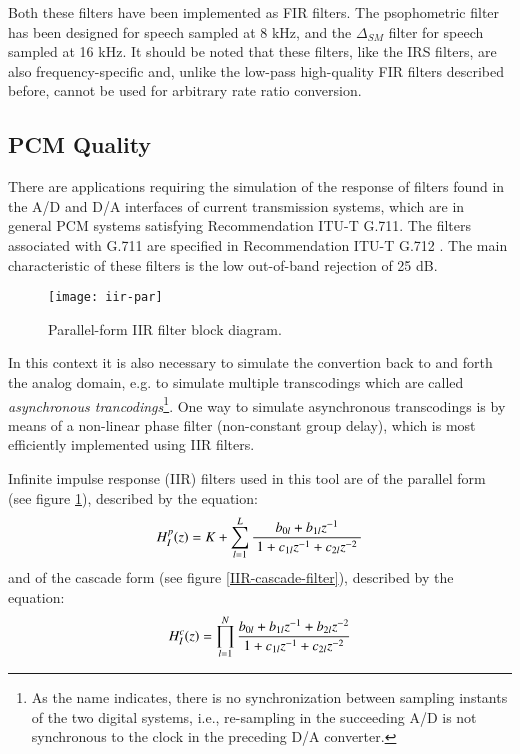 Both these filters have been implemented as FIR filters. The
psophometric filter has been designed for speech sampled at 8 kHz, and
the $\Delta_{SM}$ filter for speech sampled at 16 kHz. It should be
noted that these filters, like the IRS filters, are also
frequency-specific and, unlike the low-pass high-quality FIR filters
described before, cannot be used for arbitrary rate ratio conversion.

\subsection{PCM Quality}

There are applications requiring the simulation of the response of
filters found in the A/D and D/A interfaces of current transmission
systems, which are in general PCM systems satisfying Recommendation ITU-T G.711.
The filters associated with G.711 are specified in Recommendation ITU-T G.712 \cite{G.712}.
The main characteristic of these filters is the low out-of-band rejection of 25 dB.

\begin{figure}[h]
  \begin{center}
    \texttt{[image: iir-par]}
  \end{center}
  \caption{\SF Parallel-form IIR filter block diagram.\label{IIR-filter}}
\end{figure}

In this context it is also necessary to simulate the convertion back
to and forth the analog domain, e.g. to simulate multiple transcodings
which are called {\em asynchronous trancodings}\footnote{\SF As the
name indicates, there is no synchronization between sampling instants
of the two digital systems, i.e., re-sampling in the succeeding A/D is
not synchronous to the clock in the preceding D/A converter.}. One
way to simulate asynchronous transcodings is by means of a non-linear
phase filter (non-constant group delay), which is most efficiently
implemented using IIR filters.

Infinite impulse response (IIR) filters used in this tool are of the
parallel form (see figure \ref{IIR-filter}), described by the
equation:
\[
    H_I^p(z) = K + \sum_{l=1}^{L}
                    { b_{0l}+b_{1l} z^{-1} \over
                      \ 1+c_{1l} z^{-1}+ c_{2l} z^{-2} \
                    }
\]
and of the cascade form (see figure \ref{IIR-cascade-filter}), described
by the equation:
\[
    H_I^c(z) = \prod_{l=1}^{N}
                    { b_{0l} + b_{1l} z^{-1} + b_{2l} z^{-2}\over
                           1 + c_{1l} z^{-1} + c_{2l} z^{-2}
                    }
\]

